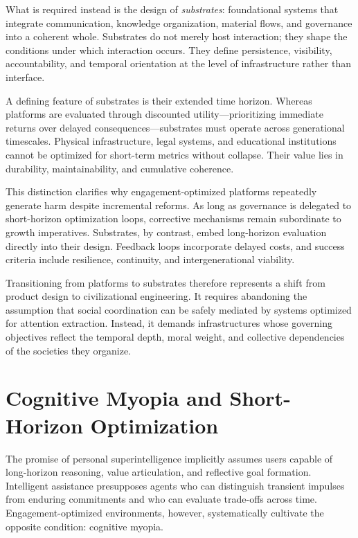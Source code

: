 \documentclass[12pt]{article}
\begin{document}
What is required instead is the design of \emph{sub\-strates}: foundational systems that integrate communication, knowledge organization, material flows, and governance into a coherent whole. Substrates do not merely host interaction; they shape the conditions under which interaction occurs. They define persistence, visibility, accountability, and temporal orientation at the level of infrastructure rather than interface.

A defining feature of substrates is their extended time horizon. Whereas platforms are evaluated through discounted utility—prioritizing immediate returns over delayed consequences—substrates must operate across generational timescales. Physical infrastructure, legal systems, and educational institutions cannot be optimized for short-term metrics without collapse. Their value lies in durability, maintainability, and cumulative coherence.

This distinction clarifies why engagement-optimized platforms repeatedly generate harm despite incremental reforms. As long as governance is delegated to short-horizon optimization loops, corrective mechanisms remain subordinate to growth imperatives. Substrates, by contrast, embed long-horizon evaluation directly into their design. Feedback loops incorporate delayed costs, and success criteria include resilience, continuity, and intergenerational viability.

Transitioning from platforms to substrates therefore represents a shift from product design to civilizational engineering. It requires abandoning the assumption that social coordination can be safely mediated by systems optimized for attention extraction. Instead, it demands infrastructures whose governing objectives reflect the temporal depth, moral weight, and collective dependencies of the societies they organize.

\section{Cognitive Myopia and Short-Horizon Optimization}

The promise of personal superintelligence implicitly assumes users capable of long-horizon reasoning, value articulation, and reflective goal formation. Intelligent assistance presupposes agents who can distinguish transient impulses from enduring commitments and who can evaluate trade-offs across time. Engagement-optimized environments, however, systematically cultivate the opposite condition: cognitive myopia.
\end{document}
